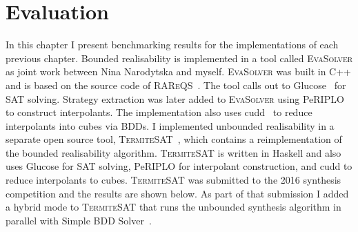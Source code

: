 \chapter{Evaluation}
\label{ch:evaluation}

\newcommand{\eva}[0]{\textsc{EvaSolver}\xspace}
\newcommand{\termitesat}[0]{\textsc{TermiteSAT}\xspace}
\newcommand{\ignore}[1]{}





In this chapter I present benchmarking results for the implementations of each previous chapter. Bounded realisability is implemented in a tool called \eva as joint work between Nina Narodytska and myself. \eva was built in C++ and is based on the source code of \textsc{RAReQS}~\cite{Janota12}. The tool calls out to Glucose~\cite{Audemard09} for SAT solving. Strategy extraction was later added to \eva using PeRIPLO~\cite{Rollini13} to construct interpolants. The implementation also uses cudd~\cite{Somenzi01} to reduce interpolants into cubes via BDDs. I implemented unbounded realisability in a separate open source tool, \termitesat~\cite{TermiteSAT}, which contains a reimplementation of the bounded realisability algorithm. \termitesat is written in Haskell and also uses Glucose for SAT solving, PeRIPLO for interpolant construction, and cudd to reduce interpolants to cubes. \termitesat was submitted to the 2016 synthesis competition and the results are shown below. As part of that submission I added a hybrid mode to \termitesat that runs the unbounded synthesis algorithm in parallel with Simple BDD Solver~\cite{Walker14b}.

